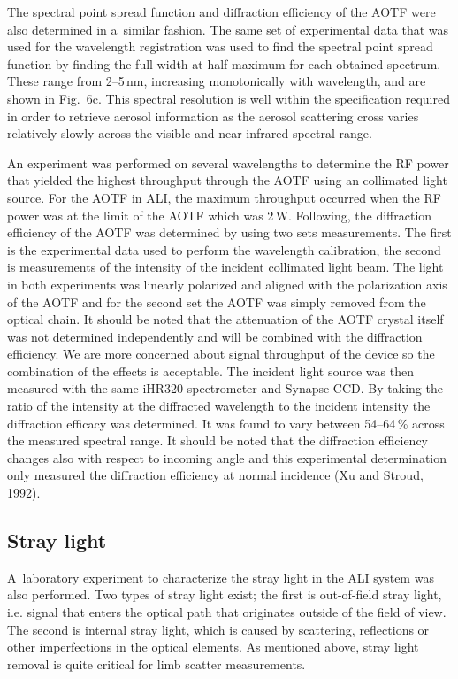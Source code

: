 \documentclass[amtd, online, hvmath]{copernicus}
\begin{document}
The spectral point spread function and diffraction efficiency of the
AOTF were also determined in a~similar fashion. The same set of
experimental data that was used for the wavelength registration was
used to find the spectral point spread function by finding the full
width at half maximum for each obtained spectrum. These range from
2--5\,\unit{nm}, increasing monotonically with wavelength, and are
shown in Fig.~6c. This spectral resolution is well within the
specification required in order to retrieve aerosol information as the
aerosol scattering cross varies relatively slowly across the visible
and near infrared spectral range.

An experiment was performed on several wavelengths to determine the RF power that yielded the highest throughput through the AOTF using an collimated light source. For the AOTF in ALI, the maximum throughput occurred when the RF power was at the limit of the AOTF which was 2\,W. Following, the diffraction efficiency of the AOTF was determined by using two sets measurements. The first is the experimental data used to perform the wavelength calibration, the second is measurements of the intensity of the incident collimated light beam. The light in both experiments was linearly polarized and aligned with the polarization axis of the AOTF and for the second set the AOTF was simply removed from the optical chain. It should be noted that the attenuation of the AOTF crystal itself was not determined independently and will be combined with the diffraction efficiency. We are more concerned about signal throughput of the device so the combination of the effects is acceptable. The incident light source was then measured with the same iHR320 spectrometer and Synapse CCD. By taking the ratio of the intensity at the diffracted wavelength to the incident intensity the diffraction efficacy was determined. It was found to vary between
54--64\,{\%} across the measured spectral range. It should be noted
that the diffraction efficiency changes also with respect to incoming
angle and this experimental determination only measured the
diffraction efficiency at normal incidence (Xu and Stroud, 1992).

\subsection{Stray light}

A~laboratory experiment to characterize the stray light in the ALI
system was also performed. Two types of stray light exist; the first
is out-of-field stray light, i.e. signal that enters the optical path
that originates outside of the field of view. The second is internal
stray light, which is caused by scattering, reflections or other
imperfections in the optical elements. As mentioned above, stray light
removal is quite critical for limb scatter measurements.
\end{document}
